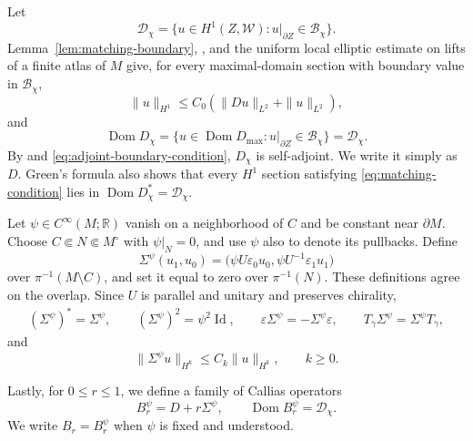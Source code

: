 \documentclass[12pt,reqno]{amsart}
\numberwithin{equation}{section}
\theoremstyle{definition}
\newcommand{\cW}{\mathscr W}
\begin{document}
Let
\[
 \mathcal D_\chi
 =\{u\in H^1(Z,\cW):u|_{\partial Z}\in\mathcal B_\chi\}.
\]
Lemma~\ref{lem:matching-boundary},
\cite[Corollaries~7.7, 7.10, and 7.15]{BaerBandara}, and the uniform
local elliptic estimate on lifts of a finite atlas of $M$ give, for
every maximal-domain section with boundary value in $\mathcal B_\chi$,
\begin{equation}\label{eq:D-H1-estimate}
 \|u\|_{H^1}\leq C_0(\|Du\|_{L^2}+\|u\|_{L^2}),
\end{equation}
and
\begin{equation}\label{eq:domain-D-chi}
 \operatorname{Dom}D_\chi
 =\{u\in\operatorname{Dom}D_{\max}:
          u|_{\partial Z}\in\mathcal B_\chi\}
 =\mathcal D_\chi.
\end{equation}
By \cite[Proposition~7.4]{BaerBandara} and
\eqref{eq:adjoint-boundary-condition}, $D_\chi$ is self-adjoint.
We write it simply as $D$.  Green's formula also shows that every
$H^1$ section satisfying \eqref{eq:matching-condition} lies in
$\operatorname{Dom}D_\chi^*=\mathcal D_\chi$.

Let $\psi\in C^\infty(M;\mathbb R)$ vanish on a neighborhood of $C$
and be constant near $\partial M$.  Choose
$C\Subset N\Subset M^\circ$ with $\psi|_N=0$, and use $\psi$ also to denote
 its pullbacks.  Define
\[
 \Sigma^\psi(u_1,u_0)
 =\bigl(\psi U\varepsilon_0u_0,
         \psi U^{-1}\varepsilon_1u_1\bigr)
\]
over $\pi^{-1}(M\setminus C)$, and set it equal to zero over
$\pi^{-1}(N)$.  These definitions agree on the overlap.  Since $U$
is parallel and unitary and preserves chirality,
\[
 \begin{gathered}
 (\Sigma^\psi)^*=\Sigma^\psi,\qquad
 (\Sigma^\psi)^2=\psi^2\operatorname{Id},\qquad
 \varepsilon\Sigma^\psi=-\Sigma^\psi\varepsilon,\qquad
 T_\gamma\Sigma^\psi=\Sigma^\psi T_\gamma,
 \end{gathered}
\]
and
\begin{equation}\label{eq:Sigma-psi-Sobolev}
 \|\Sigma^\psi u\|_{H^k}\leq C_k\|u\|_{H^k},\qquad k\geq0.
\end{equation}

Lastly, for $0\leq r\leq1$, we define a family of Callias operators
\begin{equation}\label{eq:B-family}
 B_r^\psi=D+r\Sigma^\psi,\qquad
 \operatorname{Dom}B_r^\psi=\mathcal D_\chi.
\end{equation}
We write $B_r=B_r^\psi$ when $\psi$ is fixed and understood.
\end{document}
